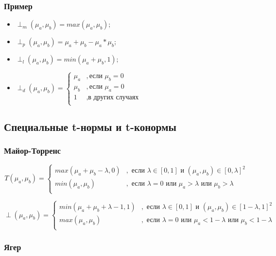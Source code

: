 \documentclass[12pt]{article}
\begin{document}
\subsubsection{Пример}
\begin{itemize}
    \item $\perp_m(\mu_a, \mu_b) = max(\mu_a, \mu_b)$;
    \item $\perp_p(\mu_a, \mu_b) = \mu_a+\mu_b-\mu_a*\mu_b$;
    \item $\perp_l(\mu_a, \mu_b) = min( \mu_a+\mu_b, 1)$;
    \item $\perp_d(\mu_a, \mu_b) =
\begin{cases}
\mu_a &, \text{если }\mu_b=0\\
\mu_b &, \text{если }\mu_a=0\\
1 &,  \text{в других случаях}\\
\end{cases}$  
\end{itemize}

\subsection{Специальные t-нормы и t-конормы}

\subsubsection{Майор-Торренс}

$$
    T(\mu_a, \mu_b) =
\begin{cases}
max(\mu_a+\mu_b-\lambda, 0) &, \text{ если }\lambda\in[0, 1] \text{ и }(\mu_a, \mu_b)\in[0,\lambda]^2\\
min(\mu_a, \mu_b) &, \text{ если } \lambda=0 \text{ или }\mu_a>\lambda \text{ или } \mu_b>\lambda\\
\end{cases}
$$

$$
\perp(\mu_a, \mu_b) =
\begin{cases}
min(\mu_a+\mu_b+\lambda-1, 1) &, \text{ если }\lambda\in[0, 1] \text{ и }(\mu_a, \mu_b)\in[1-\lambda, 1]^2\\
max(\mu_a, \mu_b) &, \text{ если } \lambda=0 \text{ или }\mu_a<1-\lambda \text{ или } \mu_b<1-\lambda\\
\end{cases} 
$$

\subsubsection{Ягер}
\end{document}
